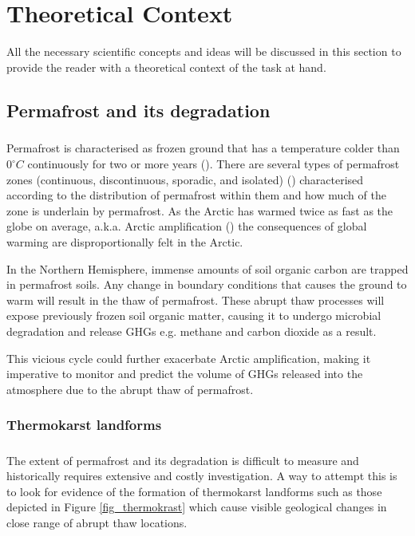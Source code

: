 \chapter{Theoretical Context} \label{lit_review}

All the necessary scientific concepts and ideas will be discussed in this section to provide the reader with a theoretical context of the task at hand.

\section{Permafrost and its degradation}  \label{perma_intro}
\paragraph{}
Permafrost is characterised as frozen ground that has a temperature colder than $0^\circ C$ continuously for two or more years (\cite{everdingen_multi-language_1998}). There are several types of permafrost zones (continuous, discontinuous, sporadic, and isolated) (\cite{obu1}) characterised according to the distribution of permafrost within them and how much of the zone is underlain by permafrost.
As the Arctic has warmed twice as fast as the globe on average, \gls{a.k.a.} Arctic amplification (\cite{climatechangefur}) the consequences of global warming are disproportionally felt in the Arctic.

In the Northern Hemisphere, immense amounts of soil organic carbon are trapped in permafrost soils. Any change in boundary conditions that causes the ground to warm will result in the thaw of permafrost. These abrupt thaw processes will expose previously frozen soil organic matter, causing it to undergo microbial degradation and release \gls{GHGs} \gls{e.g.} methane and carbon dioxide as a result.

This vicious cycle could further exacerbate Arctic amplification, making it imperative to monitor and predict the volume of GHGs released into the atmosphere due to the abrupt thaw of permafrost.

\subsection{Thermokarst landforms}  \label{thermokarst_intro}
\paragraph{}
The extent of permafrost and its degradation is difficult to measure and historically requires extensive and costly investigation. A way to attempt this is to look for evidence of the formation of thermokarst landforms such as those depicted in Figure \ref{fig_thermokrast} which cause visible geological changes in close range of abrupt thaw locations.

